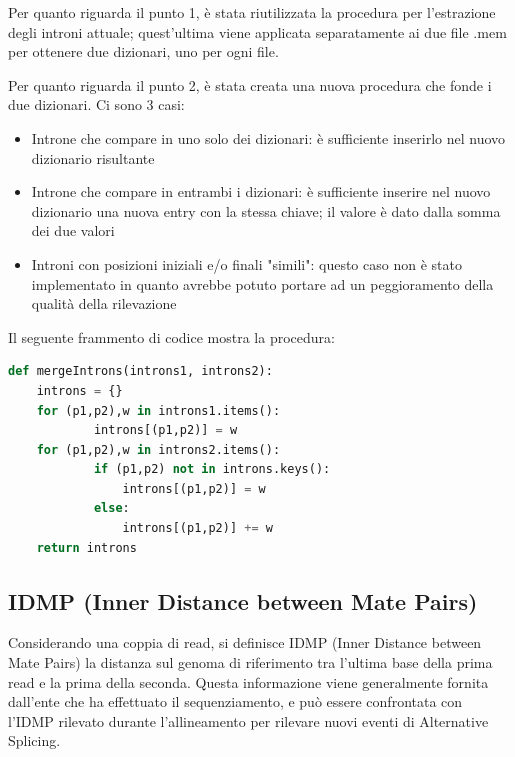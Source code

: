 Per quanto riguarda il punto 1, è stata riutilizzata la procedura per l'estrazione degli introni attuale; quest'ultima viene applicata separatamente ai due file .mem per ottenere due dizionari, uno per ogni file.

Per quanto riguarda il punto 2, è stata creata una nuova procedura che fonde i due dizionari. Ci sono 3 casi:

\newpage
\begin{itemize}
	\item Introne che compare in uno solo dei dizionari: è sufficiente inserirlo nel nuovo dizionario risultante
	\item Introne che compare in entrambi i dizionari: è sufficiente inserire nel nuovo dizionario una nuova entry con la stessa chiave; il valore è dato dalla somma dei due valori
	\item Introni con posizioni iniziali e/o finali "simili": questo caso non è stato implementato in quanto avrebbe potuto portare ad un peggioramento della qualità della rilevazione
\end{itemize}


Il seguente frammento di codice mostra la procedura:

\begin{lstlisting}[language=Python]
def mergeIntrons(introns1, introns2):
    introns = {}
    for (p1,p2),w in introns1.items():
            introns[(p1,p2)] = w
    for (p1,p2),w in introns2.items():
            if (p1,p2) not in introns.keys():
                introns[(p1,p2)] = w
            else:
                introns[(p1,p2)] += w
    return introns
\end{lstlisting}



\subsection{IDMP (Inner Distance between Mate Pairs)}
Considerando una coppia di read, si definisce IDMP (Inner Distance between Mate Pairs) la distanza sul genoma di riferimento tra l'ultima base della prima read e la prima della seconda. Questa informazione viene generalmente fornita dall'ente che ha effettuato il sequenziamento, e può essere confrontata con l'IDMP rilevato durante l'allineamento per rilevare nuovi eventi di Alternative Splicing.

